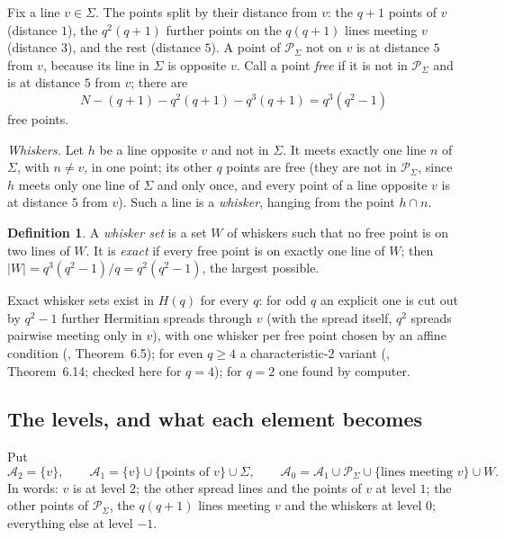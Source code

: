\documentclass[11pt]{amsart}
\theoremstyle{definition}
\newtheorem{definition}[theorem]{Definition}
\theoremstyle{remark}
\newcommand{\cA}{\mathcal{A}}
\newcommand{\PS}{\mathcal{P}_{\Sigma}}
\begin{document}
Fix a line $v\in\Sigma$. The points split by their distance from $v$: the $q+1$ points of $v$ (distance $1$), the $q^2(q+1)$ further points on the $q(q+1)$ lines meeting $v$ (distance $3$), and the rest (distance $5$). A point of $\PS$ not on $v$ is at distance $5$ from $v$, because its line in $\Sigma$ is opposite $v$. Call a point \emph{free} if it is not in $\PS$ and is at distance $5$ from $v$; there are
\[
N-(q+1)-q^2(q+1)-q^3(q+1)=q^3(q^2-1)
\]
free points.

\emph{Whiskers.} Let $h$ be a line opposite $v$ and not in $\Sigma$. It meets exactly one line $n$ of $\Sigma$, with $n\ne v$, in one point; its other $q$ points are free (they are not in $\PS$, since $h$ meets only one line of $\Sigma$ and only once, and every point of a line opposite $v$ is at distance $5$ from $v$). Such a line is a \emph{whisker}, hanging from the point $h\cap n$.

\begin{definition}\label{def:whiskers}
A \emph{whisker set} is a set $W$ of whiskers such that no free point is on two lines of $W$. It is \emph{exact} if every free point is on exactly one line of $W$; then $|W|=q^3(q^2-1)/q=q^2(q^2-1)$, the largest possible.
\end{definition}

Exact whisker sets exist in $H(q)$ for every $q$: for odd $q$ an explicit one is cut out by $q^2-1$ further Hermitian spreads through $v$ (with the spread itself, $q^2$ spreads pairwise meeting only in $v$), with one whisker per free point chosen by an affine condition (, Theorem~6.5); for even $q\ge4$ a characteristic-$2$ variant (, Theorem~6.14; checked here for $q=4$); for $q=2$ one found by computer.

\subsection{The levels, and what each element becomes}\label{ssec:thmD}
Put
\[
\cA_2=\{v\},\qquad \cA_1=\{v\}\cup\{\text{points of }v\}\cup\Sigma,\qquad \cA_0=\cA_1\cup\PS\cup\{\text{lines meeting }v\}\cup W .
\]
In words: $v$ is at level $2$; the other spread lines and the points of $v$ at level $1$; the other points of $\PS$, the $q(q+1)$ lines meeting $v$ and the whiskers at level $0$; everything else at level $-1$.
\end{document}
